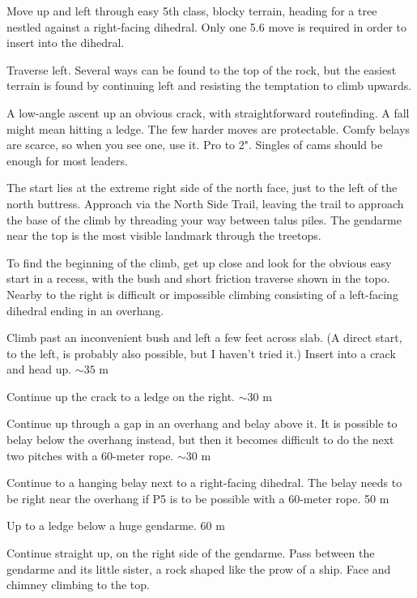 \documentclass{tahquitz}
\begin{document}
 Move up and left through easy 5th class, blocky terrain, heading for
a tree nestled against a right-facing dihedral. Only one 5.6 move is required in
order to insert into the dihedral.

 Traverse left. Several ways can be found to the top of the rock, but
the easiest terrain is found by continuing left and resisting the temptation
to climb upwards.




A low-angle ascent up an obvious crack, with straightforward routefinding.
A fall might mean hitting a ledge. The few harder moves
are protectable. Comfy belays are scarce, so when you see one, use
it. Pro to 2". Singles of cams should be enough for most leaders.

The start lies at  the extreme right side of the north face, just to
the left of the north buttress. Approach via the North Side Trail,
leaving the trail to approach the base of the climb by threading your
way between talus piles. The gendarme near the top is the most
visible landmark through the treetops.

To find the beginning of the climb, get up close and look for the
obvious easy start in a recess, with the bush and short friction
traverse shown in the topo. Nearby to the right is difficult or
impossible climbing consisting of a left-facing dihedral ending in an
overhang. 

 Climb past an inconvenient bush and left a few feet across slab.
(A direct start, to the left, is probably also possible, but I haven't tried it.)
Insert into a crack and head up. $\sim 35$ m

 Continue up the crack to a ledge on the right.  $\sim 30$ m

 Continue up through a gap in an overhang and belay above it.
It is possible to belay below the overhang instead, but then it becomes
difficult to do the next two pitches with a 60-meter rope. $\sim 30$ m

 Continue to a hanging
belay next to a right-facing dihedral. The belay needs to be right near the
overhang if P5 is to be possible with a 60-meter rope. 50 m

 Up to a ledge below a huge gendarme. 60 m

 Continue straight up, on the right side of the gendarme.
Pass between the gendarme and its little sister, a rock shaped like
the prow of a ship. Face and chimney climbing to the top.
\end{document}
